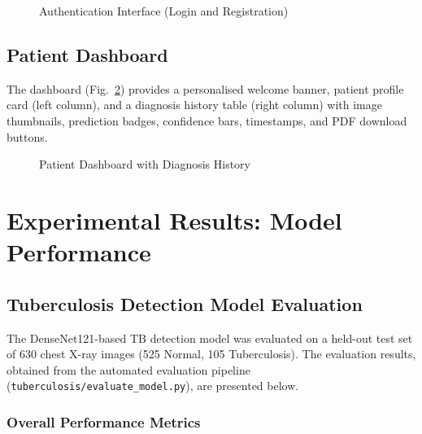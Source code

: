 \documentclass[12pt, a4paper, oneside]{report}
\begin{document}
\begin{figure}[H]
\centering
{}
\caption{Authentication Interface (Login and Registration)}
\label{fig:auth}
\end{figure}

\subsection{Patient Dashboard}

The dashboard (Fig.~\ref{fig:dashboard}) provides a personalised welcome banner, patient profile card (left column), and a diagnosis history table (right column) with image thumbnails, prediction badges, confidence bars, timestamps, and PDF download buttons.

\begin{figure}[H]
\centering
{}
\caption{Patient Dashboard with Diagnosis History}
\label{fig:dashboard}
\end{figure}

\section{Experimental Results: Model Performance}
\label{sec:model_results}

\subsection{Tuberculosis Detection Model Evaluation}

The DenseNet121-based TB detection model was evaluated on a held-out test set of 630 chest X-ray images (525 Normal, 105 Tuberculosis). The evaluation results, obtained from the automated evaluation pipeline (\texttt{tuberculosis/evaluate\_model.py}), are presented below.

\subsubsection{Overall Performance Metrics}
\end{document}
